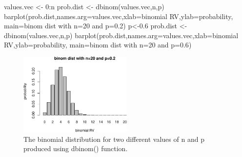 \documentclass[
  letterpaper,
  DIV=11,
  numbers=noendperiod]{scrreprt}
\newenvironment{Shaded}{\begin{snugshade}}{\end{snugshade}}
\newcommand{\AttributeTok}[1]{\textcolor[rgb]{0.40,0.45,0.13}{#1}}
\newcommand{\DecValTok}[1]{\textcolor[rgb]{0.68,0.00,0.00}{#1}}
\newcommand{\FloatTok}[1]{\textcolor[rgb]{0.68,0.00,0.00}{#1}}
\newcommand{\FunctionTok}[1]{\textcolor[rgb]{0.28,0.35,0.67}{#1}}
\newcommand{\NormalTok}[1]{\textcolor[rgb]{0.00,0.23,0.31}{#1}}
\newcommand{\OtherTok}[1]{\textcolor[rgb]{0.00,0.23,0.31}{#1}}
\newcommand{\SpecialCharTok}[1]{\textcolor[rgb]{0.37,0.37,0.37}{#1}}
\newcommand{\StringTok}[1]{\textcolor[rgb]{0.13,0.47,0.30}{#1}}
\begin{document}
\begin{Shaded}
\begin{Highlighting}[]
\NormalTok{values.vec }\OtherTok{\textless{}{-}} \DecValTok{0}\SpecialCharTok{:}\NormalTok{n}
\NormalTok{prob.dist }\OtherTok{\textless{}{-}} \FunctionTok{dbinom}\NormalTok{(values.vec,n,p)}
\FunctionTok{barplot}\NormalTok{(prob.dist,}\AttributeTok{names.arg=}\NormalTok{values.vec,}\AttributeTok{xlab=}\StringTok{\textquotesingle{}binomial RV\textquotesingle{}}\NormalTok{,}\AttributeTok{ylab=}\StringTok{\textquotesingle{}probability\textquotesingle{}}\NormalTok{,}
\AttributeTok{main=}\StringTok{\textquotesingle{}binom dist with n=20 and p=0.2\textquotesingle{}}\NormalTok{)}
\NormalTok{p}\OtherTok{\textless{}{-}}\FloatTok{0.6}
\NormalTok{prob.dist }\OtherTok{\textless{}{-}} \FunctionTok{dbinom}\NormalTok{(values.vec,n,p)}
\FunctionTok{barplot}\NormalTok{(prob.dist,}\AttributeTok{names.arg=}\NormalTok{values.vec,}\AttributeTok{xlab=}\StringTok{\textquotesingle{}binomial RV\textquotesingle{}}\NormalTok{,}\AttributeTok{ylab=}\StringTok{\textquotesingle{}probability\textquotesingle{}}\NormalTok{,}
\AttributeTok{main=}\StringTok{\textquotesingle{}binom dist with n=20 and p=0.6\textquotesingle{}}\NormalTok{)}
\end{Highlighting}
\end{Shaded}

\begin{figure}[H]

{\centering \includegraphics[width=0.5\textwidth,height=\textheight]{./probdist_files/figure-pdf/bin-dist-4-1.pdf}

}

\caption{The binomial distribution for two different values of n and p
produced using dbinom() function.}

\end{figure}
\end{document}
